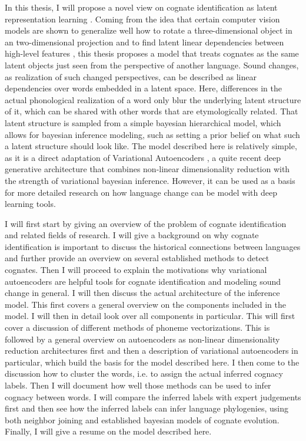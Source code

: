 \documentclass[6pt]{article}
\begin{document}
In this thesis, I will propose a novel view on cognate identification as latent representation learning \citep{bengio2013representation,Goodfellow-et-al-2016-Book}. Coming from the idea that certain computer vision models are shown to generalize well how to rotate a three-dimensional object in an two-dimensional projection and to find latent linear dependencies between high-level features \citep{radford2015unsupervised,dosovitskiy2015learning}, this thesis proposes a model that treats cognates as the same latent objects just seen from the perspective of another language. Sound changes, as realization of such changed perspectives, can be described as linear dependencies over words embedded in a latent space. Here, differences in the actual phonological realization of a word only blur the underlying latent structure of it, which can be shared with other words that are etymologically related. That latent structure is sampled from a simple bayesian hierarchical model, which allows for bayesian inference modeling, such as setting a prior belief on what such a latent structure should look like. The model described here is relatively simple, as it is a direct adaptation of Variational Autoencoders \citep{kingma2013auto}, a quite recent deep generative architecture that combines non-linear dimensionality reduction with the strength of variational bayesian inference. However, it can be used as a basis for more detailed research on how language change can be model with deep learning tools. 


I will first start by giving an overview of the problem of cognate identification and related fields of research. I will give a background on why cognate identification is important to discuss the historical connections between languages and further provide an overview on several established methods to detect cognates.  Then I will proceed to explain the motivations why variational autoencoders are helpful tools for cognate identification and modeling sound change in general. I will then discuss the actual architecture of the inference model. This first covers a general overview on the components included in the model. I will then in detail look over all components in particular. This will first cover a discussion of different methods of phoneme vectorizations. This is followed by a general overview on autoencoders as non-linear dimensionality reduction architectures first and then a description of variational autoencoders in particular, which build the basis for the model described here. I then come to the discussion how to cluster the words, i.e. to assign the actual inferred cognacy labels. Then I will document how well those methods can be used to infer cognacy between words. I will compare the inferred labels with expert judgements first and then see how the inferred labels can infer language phylogenies, using both neighbor joining and established bayesian models of cognate evolution. Finally, I will give a resume on the model described here.
\end{document}
